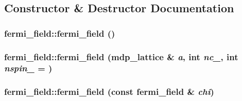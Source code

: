 \subsection{Constructor \& Destructor Documentation}
\hypertarget{classfermi__field_acaad044954df881d59d08b8b118b20e2}{
\subsubsection[{fermi\_\-field}]{\setlength{\rightskip}{0pt plus 5cm}fermi\_\-field::fermi\_\-field ()}}
\label{classfermi__field_acaad044954df881d59d08b8b118b20e2}
\hypertarget{classfermi__field_a74efc2481ac9e64071680ebad9e93569}{
\subsubsection[{fermi\_\-field}]{\setlength{\rightskip}{0pt plus 5cm}fermi\_\-field::fermi\_\-field ({\bf mdp\_\-lattice} \& {\em a}, \/  int {\em nc\_\-}, \/  int {\em nspin\_\-} = {})}}
\label{classfermi__field_a74efc2481ac9e64071680ebad9e93569}
\hypertarget{classfermi__field_a91ca1df3aa4c49140191cee2816ab320}{
\subsubsection[{fermi\_\-field}]{\setlength{\rightskip}{0pt plus 5cm}fermi\_\-field::fermi\_\-field (const {\bf fermi\_\-field} \& {\em chi})}}
\label{classfermi__field_a91ca1df3aa4c49140191cee2816ab320}


